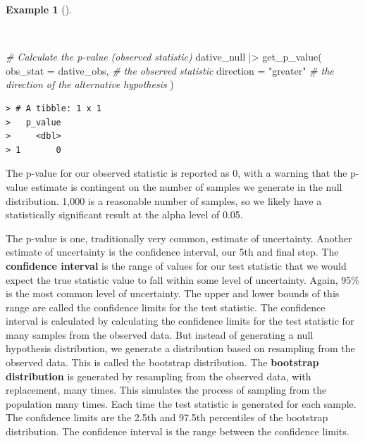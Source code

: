 \documentclass[
  letterpaper,
]{latex/krantz}
\newenvironment{Shaded}{\begin{snugshade}}{\end{snugshade}}
\newcommand{\AttributeTok}[1]{\textcolor[rgb]{0.00,0.00,0.00}{#1}}
\newcommand{\CommentTok}[1]{\textcolor[rgb]{0.00,0.00,0.00}{\textit{#1}}}
\newcommand{\FunctionTok}[1]{\textcolor[rgb]{0.00,0.00,0.00}{#1}}
\newcommand{\NormalTok}[1]{\textcolor[rgb]{0.00,0.00,0.00}{#1}}
\newcommand{\SpecialCharTok}[1]{\textcolor[rgb]{0.00,0.00,0.00}{#1}}
\newcommand{\StringTok}[1]{\textcolor[rgb]{0.00,0.00,0.00}{#1}}
\theoremstyle{definition}
\newtheorem{example}{Example}[chapter]
\theoremstyle{remark}
\begin{document}
\begin{example}[]\protect\hypertarget{exm-ida-cat-p-value}{}\label{exm-ida-cat-p-value}

~

\begin{Shaded}
\begin{Highlighting}[]
\CommentTok{\# Calculate the p{-}value (observed statistic)}
\NormalTok{dative\_null }\SpecialCharTok{|\textgreater{}}
  \FunctionTok{get\_p\_value}\NormalTok{(}
    \AttributeTok{obs\_stat =}\NormalTok{ dative\_obs, }\CommentTok{\# the observed statistic}
    \AttributeTok{direction =} \StringTok{"greater"} \CommentTok{\# the direction of the alternative hypothesis}
\NormalTok{  )}
\end{Highlighting}
\end{Shaded}

\begin{verbatim}
> # A tibble: 1 x 1
>   p_value
>     <dbl>
> 1       0
\end{verbatim}

\end{example}

The p-value for our observed statistic is reported as \(0\), with a
warning that the p-value estimate is contingent on the number of samples
we generate in the null distribution. 1,000 is a reasonable number of
samples, so we likely have a statistically significant result at the
alpha level of 0.05.

The p-value is one, traditionally very common, estimate of uncertainty.
Another estimate of uncertainty is the confidence interval, our 5th and
final step. The \textbf{confidence interval} is the range of values for
our test statistic that we would expect the true statistic value to fall
within some level of uncertainty. Again, 95\% is the most common level
of uncertainty. The upper and lower bounds of this range are called the
confidence limits for the test statistic. The confidence interval is
calculated by calculating the confidence limits for the test statistic
for many samples from the observed data. But instead of generating a
null hypothesis distribution, we generate a distribution based on
resampling from the observed data. This is called the bootstrap
distribution. The \textbf{bootstrap distribution} is generated by
resampling from the observed data, with replacement, many times. This
simulates the process of sampling from the population many times. Each
time the test statistic is generated for each sample. The confidence
limits are the 2.5th and 97.5th percentiles of the bootstrap
distribution. The confidence interval is the range between the
confidence limits.
\end{document}
